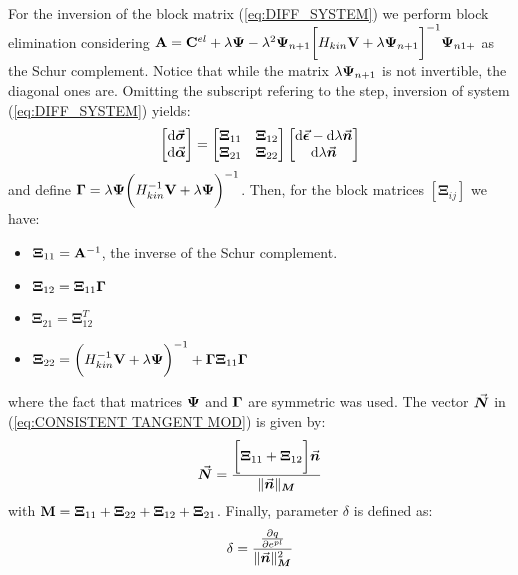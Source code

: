 \begin{appendices}
For the inversion of the block matrix (\ref{eq:DIFF_SYSTEM}) we perform block
elimination considering $\mathbf{A} =
\mathbf{C}^{el}+\lambda\mathbf{\Psi}-
\lambda 
^2\mathbf{\Psi}_{n+1}\bigg[H_{kin}\mathbf{V}+\lambda\mathbf{\Psi}_{n+1}\bigg]^{-1}\mathbf{\Psi}_{n1+}$
as
the Schur complement. Notice that while the matrix
$\lambda\mathbf{\Psi}_{n+1}$ is not invertible, the diagonal ones are.
Omitting the subscript refering to the step, inversion of 
system (\ref{eq:DIFF_SYSTEM}) yields:
\begin{equation}
	\begin{bmatrix}
		\text{d}\vec{\bm{\sigma}}\\
		\text{d}\vec{\bm{\alpha}}
	\end{bmatrix} = \begin{bmatrix}
		\bm{\Xi}_{11} &  \bm{\Xi}_{12}\\
		\bm{\Xi}_{21} &  \bm{\Xi}_{22}\\
	\end{bmatrix}\begin{bmatrix}
		\text{d}\vec{\bm{\epsilon}}-\text{d}\lambda\vec{\bm{n}}\\
		\text{d}\lambda\vec{\bm{n}}\\
	\end{bmatrix}
	\label{eq:INVERSE_SYS}
\end{equation}
and define $\mathbf{\Gamma} = 
\lambda\mathbf{\Psi}\bigg(H_{kin}^{-1}\mathbf{V}+\lambda\mathbf{\Psi}\bigg)^{-1}$.
Then, 
for the block matrices $[\bm{\Xi}_{ij}]$ we have:
\begin{itemize}
	\item $\bm{\Xi}_{11} = \mathbf{A}^{-1}$, the inverse of the Schur 
	complement.
	\item $\bm{\Xi}_{12} = \bm{\Xi}_{11}\mathbf{\Gamma}$
	\item $\bm{\Xi}_{21} = \bm{\Xi}_{12}^T$
	\item $\bm{\Xi}_{22} = 
	\bigg(H_{kin}^{-1}\mathbf{V}+\lambda\mathbf{\Psi}\bigg)^{-1} + 
	\mathbf{\Gamma}\bm{\Xi}_{11}\mathbf{\Gamma}$
\end{itemize}
\noindent where the fact that matrices $\mathbf{\Psi}$ and $\mathbf{\Gamma}$ are 
symmetric was used.
The vector $\vec{\bm{N}}$ in (\ref{eq:CONSISTENT TANGENT MOD}) is given by:
\begin{equation}
	\vec{\bm{N}} = \frac{\bigg[\bm{\Xi}_{11} + 
		\bm{\Xi}_{12}\bigg]\vec{\bm{n}}}{\Vert\vec{\bm{n}} \Vert_{\bm{M}}}
	\label{eq:NORMAL_N}
\end{equation}
\noindent with $\mathbf{M} = \bm{\Xi}_{11} + \bm{\Xi}_{22} + \bm{\Xi}_{12}
+ \bm{\Xi}_{21}$. Finally, parameter $\delta$ is defined as:
\begin{equation}
	\delta = \frac{\frac{\partial q}{\partial 
			e^{pl}}}{\Vert\vec{\bm{n}} \Vert^2_{\bm{M}}}
\end{equation}


\end{appendices}
